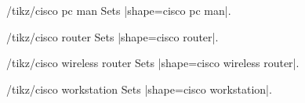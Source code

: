 \documentclass[a4paper]{ltxdoc}
\begin{document}
\begin{stylekey}{/tikz/cisco pc man}
Sets |shape={cisco pc man}|.
\begin{codeexample}[preamble={\usetikzlibrary{shapes.cisco.pcman}}]
\end{codeexample}
\end{stylekey}

\begin{stylekey}{/tikz/cisco router}
Sets |shape={cisco router}|.
\begin{codeexample}[preamble={\usetikzlibrary{shapes.cisco.router}}]
\end{codeexample}
\end{stylekey}

\begin{stylekey}{/tikz/cisco wireless router}
Sets |shape={cisco wireless router}|.
\begin{codeexample}[preamble={\usetikzlibrary{shapes.cisco.wirelessrouter}}]
\end{codeexample}
\end{stylekey}

\begin{stylekey}{/tikz/cisco workstation}
Sets |shape={cisco workstation}|.
\begin{codeexample}[preamble={\usetikzlibrary{shapes.cisco.workstation}}]
\end{codeexample}
\end{stylekey}
\end{document}
